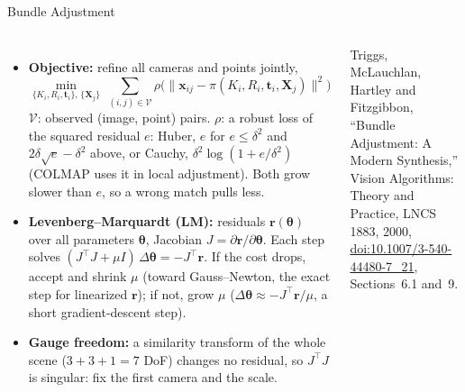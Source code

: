 \begin{frame}{Bundle Adjustment}
  \begin{columns}[T,onlytextwidth]
      \begin{itemize}\footnotesize\itemsep0.25em
        \item \textbf{Objective:} refine all cameras and points jointly,
        \[ \min_{\{K_i,R_i,\mathbf{t}_i\},\,\{\mathbf{X}_j\}}\ \sum_{(i,j)\in\mathcal{V}}\rho\Big(\big\lVert\mathbf{x}_{ij}-\pi(K_i,R_i,\mathbf{t}_i,\mathbf{X}_j)\big\rVert^2\Big) \]
        $\mathcal{V}$: observed (image, point) pairs. $\rho$: a robust loss of the squared residual $e$: Huber, $e$ for $e\leq\delta^2$ and $2\delta\sqrt{e}-\delta^2$ above, or Cauchy, $\delta^2\log(1+e/\delta^2)$ (COLMAP uses it in local adjustment). Both grow slower than $e$, so a wrong match pulls less.
        \item \textbf{Levenberg--Marquardt (LM):} residuals $\mathbf{r}(\boldsymbol{\theta})$ over all parameters $\boldsymbol{\theta}$, Jacobian $J=\partial\mathbf{r}/\partial\boldsymbol{\theta}$. Each step solves $(J^\top J+\mu I)\,\Delta\boldsymbol{\theta}=-J^\top\mathbf{r}$. If the cost drops, accept and shrink $\mu$ (toward Gauss--Newton, the exact step for linearized $\mathbf{r}$); if not, grow $\mu$ ($\Delta\boldsymbol{\theta}\approx-J^\top\mathbf{r}/\mu$, a short gradient-descent step).
        \item \textbf{Gauge freedom:} a similarity transform of the whole scene ($3+3+1=7$ DoF) changes no residual, so $J^\top J$ is singular: fix the first camera and the scale.
      \end{itemize}
      \vspace{0.1em}
      {\scriptsize Triggs, McLauchlan, Hartley and Fitzgibbon, ``Bundle Adjustment: A Modern Synthesis,'' Vision Algorithms: Theory and Practice, LNCS 1883, 2000, \href{https://doi.org/10.1007/3-540-44480-7_21}{doi:10.1007/3-540-44480-7\_21}, Sections~6.1 and~9.\par}
      \centering
\end{columns}
\end{frame}
